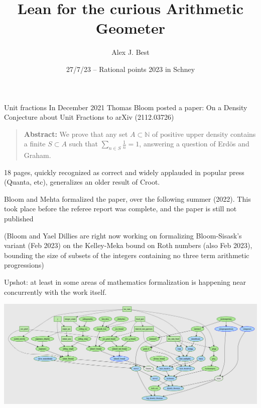 \documentclass{beamer}
\author{Alex J. Best}
\date{27/7/23 -- Rational points 2023 in Schney}
\title{Lean for the curious Arithmetic Geometer}
\theoremstyle{plain}
\begin{document}
\begin{frame}
  \titlepage

\end{frame}


\newcommand{\comment}[2]{#2}


\begin{frame}{Unit fractions}
    In December 2021 Thomas Bloom posted a paper: On a Density Conjecture about Unit Fractions to arXiv (2112.03726)
    \begin{quote}
        \textbf{Abstract:} We prove that any set $A \subset \mathbb{N}$ of positive upper density contains a finite $S \subset A$ such that $\sum_{n \in S} \frac{1}{n}=1$, answering a question of Erd\"os and Graham.
    \end{quote}
    18 pages, quickly recognized as correct and widely applauded in popular press (Quanta, etc), generalizes an older result of Croot. \pause

    Bloom and Mehta formalized the paper, over the following summer (2022).
    This took place before the referee report was complete, and the paper is still not published\pause

    (Bloom and Yael Dillies are right now working on formalizing Bloom-Sisask's variant (Feb 2023) on the Kelley-Meka bound on Roth numbers (also Feb 2023), bounding the size of subsets of the integers containing no three term arithmetic progressions)

    Upshot: at least in some areas of mathematics formalization is happening near concurrently with the work itself.
\end{frame}

\begin{frame}
    \includegraphics[width=1.1\linewidth]{unit.png}
\end{frame}
\end{document}
